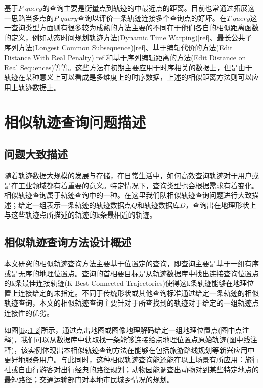 基于$P$-$query$的查询主要是衡量点到轨迹的中最近点的距离。目前也常通过拓展这一思路当多点的$P$-$query$查询以评价一条轨迹连接多个查询点的好坏。在$T$-$query$这一查询类型方面则有很多较为成熟的方法主要的不同在于他们各自的相似距离函数的定义，例如动态时间规划轨迹方法(Dynamic Time Warping)[ref]、最长公共子序列方法(Longest Common Subsequence)[ref]、基于编辑代价的方法(Edit Distance With Real Penalty)[ref]和基于序列编辑距离的方法(Edit Distance on Real Sequences)等等。这些方法在初期主要应用于时序相关的数据上，但是由于轨迹在某种意义上可以看成是多维度上的时序数据，上述的相似距离方法则可以应用上轨迹数据上。
\\

\section{相似轨迹查询问题描述}
\label{sec:requirements}

\subsection{问题大致描述}
\label{subsec:question}
随着轨迹数据大规模的发展与存储，在日常生活中，如何高效查询轨迹对于用户或是在工业领域都有着重要的意义。特定情况下，查询类型也会根据需求有着变化。相似轨迹查询属于轨迹查询中的一种。在这里我们队相似轨迹查询问题进行大致描述；给定一组表示一条轨迹的轨迹数据点$Q$和轨迹数据库$D$，查询出在地理形状上与这些轨迹点所描述的轨迹的k条最相近的轨迹。

\subsection{相似轨迹查询方法设计概述}
\label{subsec:requirements}
本文研究的相似轨迹查询方法主要基于位置定的查询，即查询主要是基于一组有序或是无序的地理位置点。查询的首相要目标是从轨迹数据库中找出连接查询位置点的k条最佳连接轨迹(K Best-Connected Trajectories)使得这k条轨迹能够在地理位置上连接给定的未指定。不同于传统形状或其他查询标准通过给定一条轨迹的相似轨迹查询，本文的相似轨迹查询主要针对于所查找到的轨迹对于给定的一组轨迹点连接性的优劣。

如图\ref{fig:1-2}\cite{chen2010searching}所示，通过点击地图或图像地理解码给定一组地理位置点(图中点注释)，我们可以从数据库中获取找一条能够连接给点地理位置点原始轨迹(图中线注释)，该实例体现出本相似轨迹查询方法在能够在包括旅游路线规划等新兴应用中更好地服务用户。与此同时，这种相似轨迹查询能还能在以上场景有所应用：旅行社或自由行游客对出行经典的路径规划；动物园能调查出动物对到某些特定地点的最短路径；交通运输部门对本地市民城乡情况的规划。

